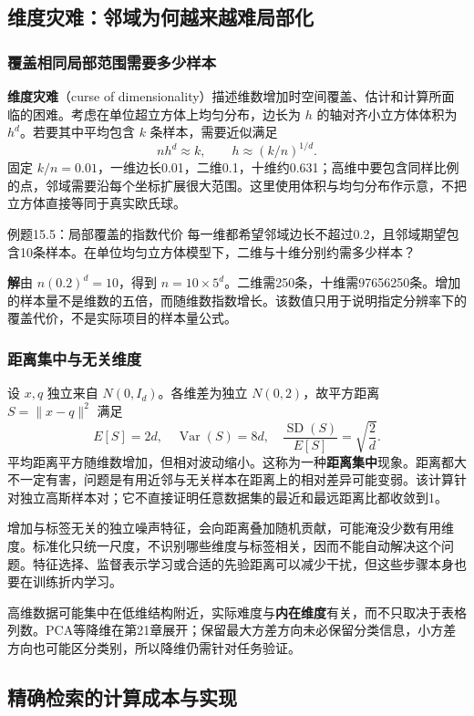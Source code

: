 \documentclass[UTF8,fontset=none,zihao=-4,a4paper]{ctexart}
\newcommand{\term}[1]{\textbf{#1}}
\newcommand{\sol}{\par\noindent\textbf{解}\quad}
\numberwithin{equation}{section}
\numberwithin{figure}{section}
\begin{document}
\subsection{维度灾难：邻域为何越来越难局部化}
\subsubsection{覆盖相同局部范围需要多少样本}
\term{维度灾难}（curse of dimensionality）描述维数增加时空间覆盖、估计和计算所面临的困难。考虑在单位超立方体上均匀分布，边长为 $h$ 的轴对齐小立方体体积为 $h^d$。若要其中平均包含 $k$ 条样本，需要近似满足
\[
 nh^d\approx k,\qquad h\approx(k/n)^{1/d}.
\]
固定 $k/n=0.01$，一维边长0.01，二维0.1，十维约0.631；高维中要包含同样比例的点，邻域需要沿每个坐标扩展很大范围。这里使用体积与均匀分布作示意，不把立方体直接等同于真实欧氏球。

\begin{infobox}[unbreakable]{例题15.5：局部覆盖的指数代价}
每一维都希望邻域边长不超过0.2，且邻域期望包含10条样本。在单位均匀立方体模型下，二维与十维分别约需多少样本？
\sol 由 $n(0.2)^d=10$，得到 $n=10\times5^d$。二维需250条，十维需97656250条。增加的样本量不是维数的五倍，而随维数指数增长。该数值只用于说明指定分辨率下的覆盖代价，不是实际项目的样本量公式。
\end{infobox}

\subsubsection{距离集中与无关维度}
设 $x,q$ 独立来自 $N(0,I_d)$。各维差为独立 $N(0,2)$，故平方距离 $S=\|x-q\|^2$ 满足
\[
 E[S]=2d,\quad\operatorname{Var}(S)=8d,\quad
 \frac{\operatorname{SD}(S)}{E[S]}=\sqrt{\frac2d}.
\]
平均距离平方随维数增加，但相对波动缩小。这称为一种\term{距离集中}现象。距离都大不一定有害，问题是有用近邻与无关样本在距离上的相对差异可能变弱。该计算针对独立高斯样本对；它不直接证明任意数据集的最近和最远距离比都收敛到1。

增加与标签无关的独立噪声特征，会向距离叠加随机贡献，可能淹没少数有用维度。标准化只统一尺度，不识别哪些维度与标签相关，因而不能自动解决这个问题。特征选择、监督表示学习或合适的先验距离可以减少干扰，但这些步骤本身也要在训练折内学习。

高维数据可能集中在低维结构附近，实际难度与\term{内在维度}有关，而不只取决于表格列数。PCA等降维在第21章展开；保留最大方差方向未必保留分类信息，小方差方向也可能区分类别，所以降维仍需针对任务验证。

\subsection{精确检索的计算成本与实现}
\end{document}
